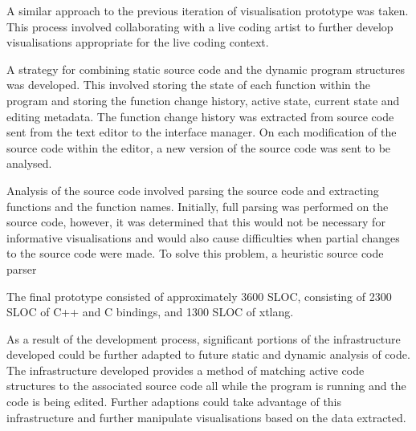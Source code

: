 A similar approach to the previous iteration of visualisation prototype was taken. This process involved collaborating with a live coding artist to further develop visualisations appropriate for the live coding context.

A strategy for combining static source code and the dynamic program structures was developed. This involved storing the state of each function within the program and storing the function change history, active state, current state and editing metadata. The function change history was extracted from source code sent from the text editor to the interface manager. On each modification of the source code within the editor, a new version of the source code was sent to be analysed.

Analysis of the source code involved parsing the source code and extracting functions and the function names. Initially, full parsing was performed on the source code, however, it was determined that this would not be necessary for informative visualisations and would also cause difficulties when partial changes to the source code were made. To solve this problem, a heuristic source code parser





The final prototype consisted of approximately 3600 \acf{SLOC}, consisting of 2300 \ac{SLOC} of C++ and C bindings, and 1300 \ac{SLOC} of xtlang.


As a result of the development process, significant portions of the infrastructure developed could be further adapted to future static and dynamic analysis of code. The infrastructure developed provides a method of matching active code structures to the associated source code all while the program is running and the code is being edited. Further adaptions could take advantage of this infrastructure and further manipulate visualisations based on the data extracted.

